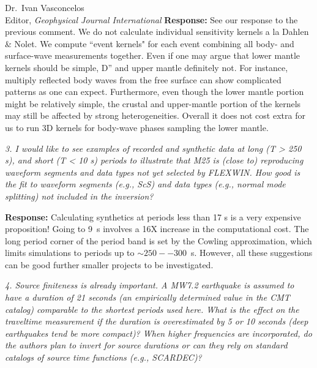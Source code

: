 \documentclass[11pt,a4paper]{letter}
\newcommand{\cyan}[1]{\textbf{\textcolor{Cyan}{#1}}}
\newcommand{\orange}[1]{\textbf{\textcolor{Orange}{#1}}}
\newcommand{\toebru}[1]{\textbf{\cyan{*** Ebru: #1 ***}}}
\newcommand{\fromebru}[1]{\textbf{\orange{*** Ebru: #1 ***}}}
\newcommand{\response}[1]{\textbf{Response:} #1}
\newcommand{\rev}[1]{{\it{#1}}}
\begin{document}
\begin{letter}{Dr.~Ivan Vasconcelos\\
Editor, \textit{Geophysical Journal International}}
\response{See our response to the previous comment. We do not calculate individual sensitivity kernels a la Dahlen \& Nolet. We compute ``event kernels" for each event combining all body- and surface-wave measurements together. Even if one may argue that lower mantle kernels should be simple, D'' and upper mantle definitely not. For instance, multiply reflected body waves from the free surface can show complicated patterns as one can expect. Furthermore, even though the lower mantle portion might be relatively simple, the crustal and upper-mantle portion of the kernels may still be affected by strong heterogeneities. Overall it does not cost extra for us to run 3D kernels for body-wave phases sampling the lower mantle. 
}

\rev{3. I would like to see examples of recorded and synthetic data at long (T > 250 s), and short (T < 10 s) periods to illustrate that M25 is (close to) reproducing waveform segments and data types not yet selected by FLEXWIN. How good is the fit to waveform segments (e.g., ScS) and data types (e.g., normal mode splitting) not included in the inversion?
}

\response{Calculating synthetics at periods less than 17 s is a very expensive proposition! Going to 9~s involves a 16X increase in the computational cost. The long period corner of the period band is set by the Cowling approximation,
which limits simulations to periods up to $\sim250--300$~s. However, all these suggestions can be good further smaller projects to be investigated.
}

\rev{4. Source finiteness is already important. A MW7.2 earthquake is assumed to have a duration of 21 seconds (an empirically determined value in the CMT catalog) comparable to the shortest periods used here. What is the effect on the traveltime measurement if the duration is overestimated by 5 or 10 seconds (deep earthquakes tend be more compact)? When higher frequencies are incorporated, do the authors plan to invert for source durations or can they rely on standard catalogs of source time functions (e.g., SCARDEC)?
}


\end{letter}
\end{document}
